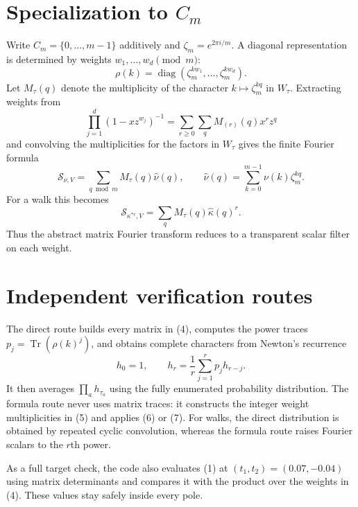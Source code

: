 \documentclass[10pt]{article}
\newcommand{\Sfun}{\mathcal S}
\newcommand{\Tr}{\operatorname{Tr}}
\begin{document}
\section{Specialization to \texorpdfstring{$C_m$}{C-m}}
Write $C_m=\{0,\ldots,m-1\}$ additively and
$\zeta_m=e^{2\pi i/m}$.  A diagonal representation is determined by weights
$w_1,\ldots,w_d\pmod m$:
\begin{equation}
\rho(k)=\operatorname{diag}(\zeta_m^{kw_1},\ldots,
\zeta_m^{kw_d}).                                           \tag{4}
\end{equation}
Let $M_\tau(q)$ denote the multiplicity of the character $k\mapsto
\zeta_m^{kq}$ in $W_\tau$.  Extracting weights from
\begin{equation}
\prod_{j=1}^d(1-xz^{w_j})^{-1}
=\sum_{r\geq0}\sum_q M_{(r)}(q)x^rz^q                    \tag{5}
\end{equation}
and convolving the multiplicities for the factors in $W_\tau$ gives the
finite Fourier formula
\begin{equation}
[\mathbf t^\tau]\Sfun_{\nu,V}
=\sum_{q\bmod m}M_\tau(q)\widehat\nu(q),
\qquad
\widehat\nu(q)=\sum_{k=0}^{m-1}\nu(k)\zeta_m^{kq}.        \tag{6}
\end{equation}
For a walk this becomes
\begin{equation}
[\mathbf t^\tau]\Sfun_{\kappa^{*r},V}
=\sum_qM_\tau(q)\widehat\kappa(q)^r.                     \tag{7}
\end{equation}
Thus the abstract matrix Fourier transform reduces to a transparent scalar
filter on each weight.

\section{Independent verification routes}
The direct route builds every matrix in (4), computes the power traces
$p_j=\Tr(\rho(k)^j)$, and obtains complete characters from Newton's recurrence
\begin{equation}
h_0=1,\qquad h_r=\frac1r\sum_{j=1}^r p_jh_{r-j}.            \tag{8}
\end{equation}
It then averages $\prod_a h_{\tau_a}$ using the fully enumerated
probability distribution.  The formula route never uses matrix traces: it
constructs the integer weight multiplicities in (5) and applies (6) or (7).
For walks, the direct distribution is obtained by repeated cyclic convolution,
whereas the formula route raises Fourier scalars to the $r$th power.

As a full target check, the code also evaluates (1) at
$(t_1,t_2)=(0.07,-0.04)$ using matrix determinants and compares it with the
product over the weights in (4).  These values stay safely inside every pole.
\end{document}
